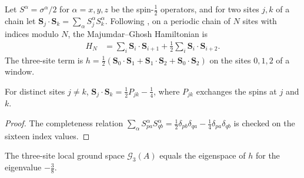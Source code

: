 \begin{definition}\label{def:majumdar_ghosh_hamiltonian}
    \leanok
    Let $S^\alpha=\sigma^\alpha/2$ for $\alpha=x,y,z$ be the spin-$\tfrac12$
    operators, and for two sites $j,k$ of a chain let
    $\mathbf S_j\cdot\mathbf S_k=\sum_\alpha S^\alpha_jS^\alpha_k$. Following
    \cite[Appendix~A, ``The Majumdar-Ghosh model'']{Cirac2021Matrix}, on a
    periodic chain of $N$ sites with indices modulo $N$, the Majumdar--Ghosh
    Hamiltonian is
    \begin{align}
        H_N & = \sum_{i}\mathbf S_i\cdot\mathbf S_{i+1}
        +\tfrac12\sum_{i}\mathbf S_i\cdot\mathbf S_{i+2}.
        \label{eq:mg_hamiltonian}
    \end{align}
    The three-site term is
    $h=\tfrac12(\mathbf S_0\cdot\mathbf S_1+\mathbf S_1\cdot\mathbf S_2
        +\mathbf S_0\cdot\mathbf S_2)$ on the sites $0,1,2$ of a window.
\end{definition}

\begin{lemma}\label{thm:spin_exchange_swap}
    \leanok
    For distinct sites $j\neq k$,
    $\mathbf S_j\cdot\mathbf S_k=\tfrac12P_{jk}-\tfrac14$, where $P_{jk}$
    exchanges the spins at $j$ and $k$.
\end{lemma}

\begin{proof}
    \leanok
    The completeness relation
    $\sum_\alpha S^\alpha_{pa}S^\alpha_{qb}
        =\tfrac12\delta_{pb}\delta_{qa}-\tfrac14\delta_{pa}\delta_{qb}$ is checked on
    the sixteen index values.
\end{proof}

\begin{lemma}%
    \label{thm:majumdar_ghosh_local_ground_space}
    \leanok
    The three-site local ground space $\mathcal G_3(A)$ equals the eigenspace
    of $h$ for the eigenvalue $-\tfrac38$.
\end{lemma}

